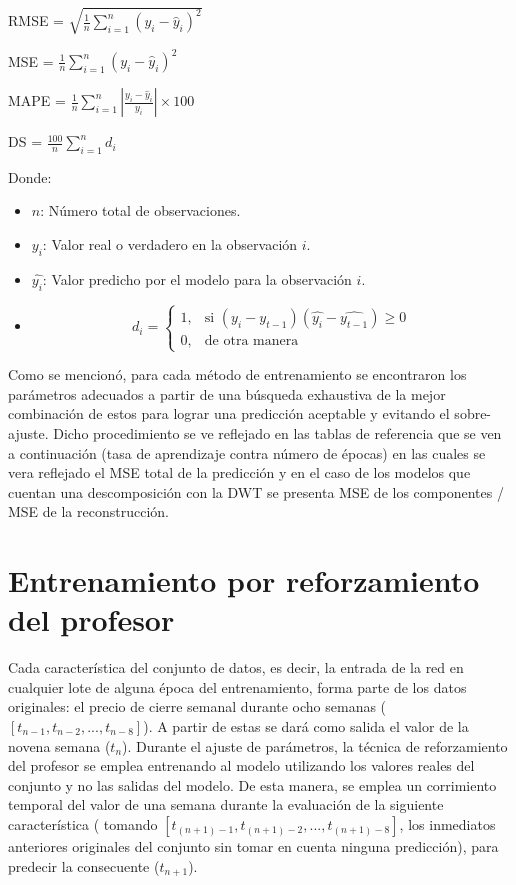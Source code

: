 \begin{center}
    RMSE = $\sqrt{\frac{1}{n} \sum_{i=1}^{n} (y_i - \hat{y}_i)^2}$

    MSE = $\frac{1}{n} \sum_{i=1}^{n} (y_i - \hat{y}_i)^2$

    MAPE = $\frac{1}{n} \sum_{i=1}^{n} \left| \frac{y_i - \hat{y}_i}{y_i} \right| \times 100$
    
    DS = $\frac{100}{n} \sum_{i=1}^{n} d_i$
\end{center}

Donde:
\begin{itemize}
    \item $n$: Número total de observaciones.
    \item $y_i$: Valor real o verdadero en la observación $i$.
    \item $\hat{y_i}$: Valor predicho por el modelo para la observación $i$.
    \item \[
    d_i = 
    \begin{cases}
    1, & \text{si } (y_{i}-y_{t-1})(\hat{y_{i}}-\hat{y_{t-1}}) \geq 0 \\
    0, & \text{de otra manera}
    \end{cases}
    \]
\end{itemize}

Como se mencionó, para cada método de entrenamiento se encontraron los parámetros adecuados a partir de una búsqueda exhaustiva de la mejor combinación de estos para lograr una predicción aceptable y evitando el sobre-ajuste. Dicho procedimiento se ve reflejado en las tablas de referencia que se ven a continuación (tasa de aprendizaje contra número de épocas) en las cuales se vera reflejado el MSE total de la predicción y en el caso de los modelos que cuentan una descomposición con la DWT se presenta MSE de los componentes / MSE de la reconstrucción.

\newpage

\section{Entrenamiento por reforzamiento del profesor}

Cada característica del conjunto de datos, es decir, la entrada de la red en cualquier lote de alguna época del entrenamiento, forma parte de los datos originales: el precio de cierre semanal durante ocho semanas ($[t_{n-1}, t_{n-2}, ...,t_{n-8}]$). A partir de estas se dará como salida el valor de la novena semana ($t_n$). Durante el ajuste de parámetros, la técnica de reforzamiento del profesor se emplea entrenando al modelo utilizando los valores reales del conjunto y no las salidas del modelo. De esta manera, se emplea un corrimiento temporal del valor de una semana durante la evaluación de la siguiente característica ( tomando $[t_{(n+1)-1}, t_{(n+1)-2}, ...,t_{(n+1)-8}]$, los inmediatos anteriores originales del conjunto sin tomar en cuenta ninguna predicción), para predecir la consecuente ($t_{n+1}$). 

